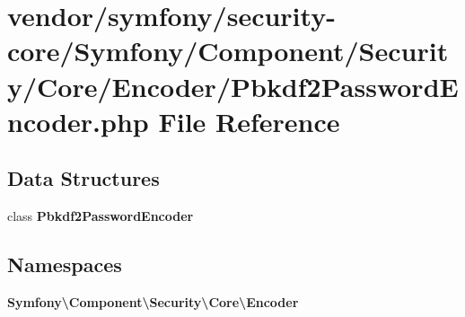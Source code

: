 \section{vendor/symfony/security-\/core/\+Symfony/\+Component/\+Security/\+Core/\+Encoder/\+Pbkdf2\+Password\+Encoder.php File Reference}
\label{_pbkdf2_password_encoder_8php}
\subsection*{Data Structures}
\begin{DoxyCompactItemize}
\item 
class {\bf Pbkdf2\+Password\+Encoder}
\end{DoxyCompactItemize}
\subsection*{Namespaces}
\begin{DoxyCompactItemize}
\item 
 {\bf Symfony\textbackslash{}\+Component\textbackslash{}\+Security\textbackslash{}\+Core\textbackslash{}\+Encoder}
\end{DoxyCompactItemize}
